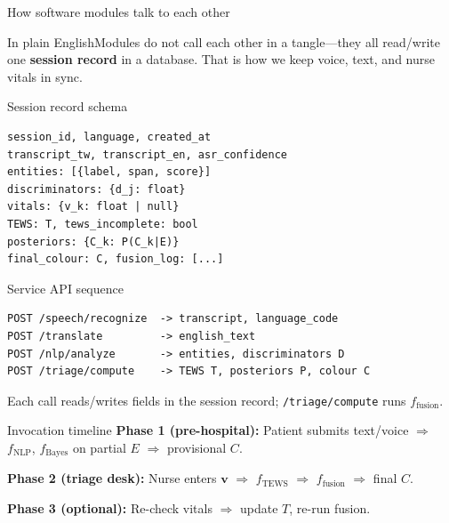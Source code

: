 \documentclass[aspectratio=169,11pt]{beamer}
\newcommand{\plain}[1]{\begin{block}{In plain English}\small #1\end{block}}
\begin{document}
\begin{frame}{How software modules talk to each other}
	\begin{center}
	\end{center}

	\plain{Modules do not call each other in a tangle---they all read/write one \textbf{session record} in a database. That is how we keep voice, text, and nurse vitals in sync.}
\end{frame}

\begin{frame}[fragile]{Session record schema}
	\footnotesize
	\begin{verbatim}
session_id, language, created_at
transcript_tw, transcript_en, asr_confidence
entities: [{label, span, score}]
discriminators: {d_j: float}
vitals: {v_k: float | null}
TEWS: T, tews_incomplete: bool
posteriors: {C_k: P(C_k|E)}
final_colour: C, fusion_log: [...]
	\end{verbatim}
\end{frame}

\begin{frame}[fragile]{Service API sequence}
	\footnotesize
	\begin{verbatim}
POST /speech/recognize  -> transcript, language_code
POST /translate         -> english_text
POST /nlp/analyze       -> entities, discriminators D
POST /triage/compute    -> TEWS T, posteriors P, colour C
	\end{verbatim}
	Each call reads/writes fields in the session record; \texttt{/triage/compute} runs $f_{\text{fusion}}$.
\end{frame}

\begin{frame}{Invocation timeline}
	\textbf{Phase 1 (pre-hospital):} Patient submits text/voice $\Rightarrow$ $f_{\text{NLP}}$, $f_{\text{Bayes}}$ on partial $E$ $\Rightarrow$ provisional $C$.

	\textbf{Phase 2 (triage desk):} Nurse enters $\mathbf{v}$ $\Rightarrow$ $f_{\text{TEWS}}$ $\Rightarrow$ $f_{\text{fusion}}$ $\Rightarrow$ final $C$.

	\textbf{Phase 3 (optional):} Re-check vitals $\Rightarrow$ update $T$, re-run fusion.
\end{frame}
\end{document}

